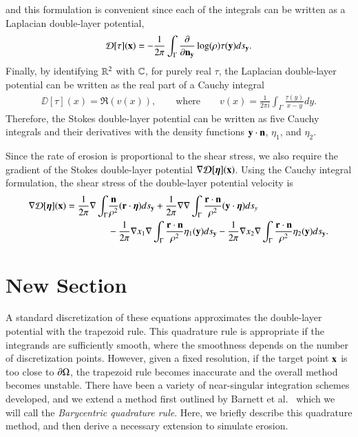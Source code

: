 \documentclass[preprint, 10pt]{elsarticle}
\newcommand{\D}{\mbox{${\mathcal D}$}}
\begin{document}
and this formulation is convenient since each of the integrals can be
written as a Laplacian double-layer potential,
\begin{align}
  {\mathcal{D}}[\tau]({\mathbf{x}}) = -\frac{1}{2\pi} \int_{\Gamma} \frac{\partial }{\partial {\mathbf{n}}_{\mathbf{y}}}
    \log(\rho) \tau({\mathbf{y}}) ds_{\mathbf{y}}.
\end{align}
Finally, by identifying ${\mathbb{R}}^2$ with ${\mathbb{C}}$, for purely real $\tau$, the
Laplacian double-layer potential can be written as the real part of a
Cauchy integral
\begin{align}
  \DD[\tau](x) = \Re (v(x)),
  \qquad \text{where} \qquad
  v(x) = \frac{1}{2\pi i} \int_\Gamma \frac{\tau(y)}{x - y} dy.
\end{align}
Therefore, the Stokes double-layer potential can be written as five
Cauchy integrals and their derivatives with the density functions ${\mathbf{y}}
\cdot {\mathbf{n}}$, $\eta_1$, and $\eta_2.$ 

Since the rate of erosion is proportional to the shear stress, we also
require the gradient of the Stokes double-layer potential $\nabla
{\boldsymbol{\mathcal D}}[{\boldsymbol\eta}]({\mathbf{x}})$.  Using the Cauchy integral formulation, the shear
stress of the double-layer potential velocity is
\begin{align}
  \nabla\D[\eeta](\xx) = \frac{1}{2\pi}\nabla\int_{\Gamma}
    &\frac{\nn}{\rho^2}(\rr \cdot \eeta)ds_\yy +
  \frac{1}{2\pi}\nabla\nabla\int_{\Gamma}
    \frac{\rr \cdot \nn}{\rho^2}({\yy} \cdot\eeta) ds_y \\
  &- \frac{1}{2\pi} \nabla x_1 \nabla \int_{\Gamma}
      \frac{\rr \cdot \nn}{\rho^2}\eta_1(\yy) ds_\yy -
  \frac{1}{2\pi} \nabla x_2 \nabla \int_{\Gamma}
      \frac{\rr \cdot \nn}{\rho^2}\eta_2(\yy) ds_\yy.
\end{align}


\section{New Section}
A standard discretization of these equations approximates the
double-layer potential with the trapezoid rule.  This quadrature rule is
appropriate if the integrands are sufficiently smooth, where the
smoothness depends on the number of discretization points.  However,
given a fixed resolution, if the target point ${\mathbf{x}}$ is too close to ${\partial}
\Omega$, the trapezoid rule becomes inaccurate and the overall method
becomes unstable.  There have been a variety of near-singular
integration schemes developed, and we extend a method first outlined by
Barnett et al.~\cite{bar-wu-vee2015} which we will call the {\em
Barycentric quadrature rule}.  Here, we briefly describe this quadrature
method, and then derive a necessary extension to simulate erosion.
\end{document}
